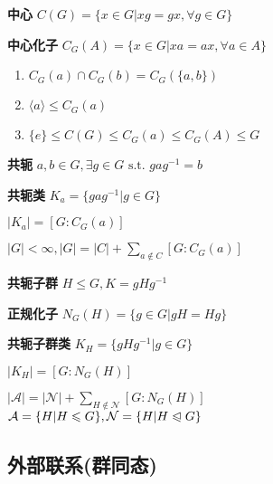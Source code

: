 \documentclass[a4paper,10pt]{ctexart}
\newcommand*{\st}{\text{ s.t. }}
\renewcommand*{\leq}{\leqslant}
\newcommand*{\nmsubgroupeq}{\trianglelefteqslant}
\newcommand*{\gengroup}[1]{\langle #1 \rangle}
\begin{document}
\begin{multicols}{3}
    \textbf{中心} $C(G) = \{ x \in G | xg = gx, \forall g \in G\}$

    \textbf{中心化子} $C_G(A) \! = \! \{x \!\in\! G | xa \! = \! ax, \forall a \!\in\! A\}$

    \begin{theorem}[中心化子性质]
        \hfil

        \begin{enumerate}
            \item $C_G(a) \cap C_G(b) = C_G(\{a, b\})$
            \item $\gengroup{a} \leq C_G(a)$
            \item $\{e\} \!\leq\! C(G) \!\leq\! C_G(a) \!\leq\! C_G(A) \!\leq\! G$
        \end{enumerate}
    \end{theorem}

    \textbf{共轭} $a, b \in G, \exists g \in G \st gag^{-1}=b$

    \textbf{共轭类} $K_a = \{ gag^{-1} | g \in G \}$

    \begin{theorem}[共轭子群基数定理]
        $|K_a| = [G:C_G(a)]$
    \end{theorem}

    \begin{theorem}[类方程]
        $|G| \! < \! \infty, |G| \! = \! |C| + \sum\limits_{a \notin C} [G:C_G(a)]$
    \end{theorem}

    \textbf{共轭子群} $H \leq G, K = gHg^{-1}$

    \textbf{正规化子} $N_G(H) = \{g \in G | gH = Hg\}$

    \textbf{共轭子群类} $K_H = \{gHg^{-1} | g \in G\}$

    \begin{theorem}[共轭子群类基数定理]
        $|K_H| \!\! = \!\! [G:N_G(H)]$
    \end{theorem}

    \begin{theorem}[类方程2]
        $|\mathcal{A}| = |\mathcal{N}| + \sum\limits_{H \notin \mathcal{N}} [G:N_G(H)]$ \\
        $\mathcal{A} = \{ H | H \leq G \}, \mathcal{N} = \{ H | H \nmsubgroupeq G \}$
    \end{theorem}

    \subsection{外部联系(群同态)} \label{sec:group-homomorphism}


\end{multicols}
\end{document}
